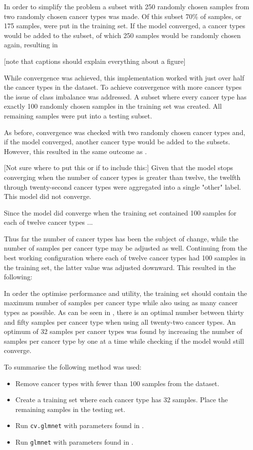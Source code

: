 In order to simplify the problem a subset with 250 randomly chosen samples from two randomly chosen cancer types was made.
Of this subset 70\% of samples, or 175 samples, were put in the training set.
If the model converged, a cancer types would be added to the subset, of which 250 samples would be randomly chosen again, resulting in 

[note that captions should explain everything about a figure]


While convergence was achieved, this implementation worked with just over half the cancer types in the dataset.
To achieve convergence with more cancer types the issue of class imbalance was addressed.
A subset where every cancer type has exactly 100 randomly chosen samples in the training set was created.
All remaining samples were put into a testing subset.

As before, convergence was checked with two randomly chosen cancer types and, if the model converged, another cancer type would be added to the subsets.
However, this resulted in the same outcome as .

[Not sure where to put this or if to include this:]
Given that the model stops converging when the number of cancer types is greater than twelve, the twelfth through twenty-second cancer types were aggregated into a single "other" label.
This model did not converge.

Since the model did converge when the training set contained 100 samples for each of twelve cancer types ...

Thus far the number of cancer types has been the subject of change, while the number of samples per cancer type may be adjusted as well.
Continuing from the best working configuration where each of twelve cancer types had 100 samples in the training set, the latter value was adjusted downward.
This resulted in the following:


In order the optimise performance and utility, the training set should contain the maximum number of samples per cancer type while also using as many cancer types as possible.
As can be seen in , there is an optimal number between thirty and fifty samples per cancer type when using all twenty-two cancer types.
An optimum of 32 samples per cancer types was found by increasing the number of samples per cancer type by one at a time while checking if the model would still converge.

To summarise the following method was used:
\begin{itemize}
    \item Remove cancer types with fewer than 100 samples from the dataset.
    \item Create a training set where each cancer type has 32 samples. Place the remaining samples in the testing set.
    \item Run \verb|cv.glmnet| with parameters found in .
    \item Run \verb|glmnet| with parameters found in .
\end{itemize}

